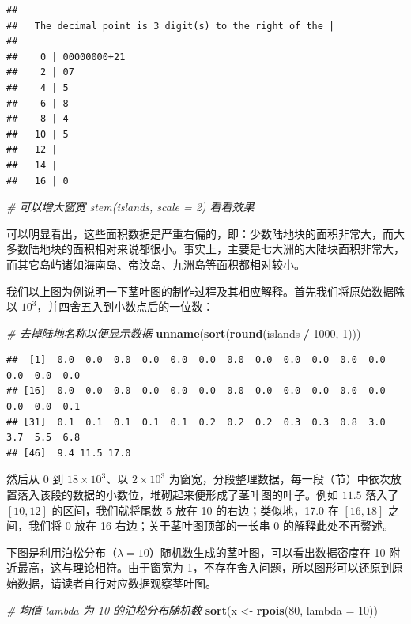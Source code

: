 \documentclass[
  b5paper,
  UTF8,twoside]{book}
\newenvironment{Shaded}{\begin{snugshade}}{\end{snugshade}}
\newcommand{\AttributeTok}[1]{\textcolor[rgb]{0.13,0.29,0.53}{#1}}
\newcommand{\CommentTok}[1]{\textcolor[rgb]{0.56,0.35,0.01}{\textit{#1}}}
\newcommand{\DecValTok}[1]{\textcolor[rgb]{0.00,0.00,0.81}{#1}}
\newcommand{\FunctionTok}[1]{\textcolor[rgb]{0.13,0.29,0.53}{\textbf{#1}}}
\newcommand{\NormalTok}[1]{#1}
\newcommand{\OtherTok}[1]{\textcolor[rgb]{0.56,0.35,0.01}{#1}}
\newcommand{\SpecialCharTok}[1]{\textcolor[rgb]{0.81,0.36,0.00}{\textbf{#1}}}
\begin{document}
\begin{verbatim}
## 
##   The decimal point is 3 digit(s) to the right of the |
## 
##    0 | 00000000+21
##    2 | 07
##    4 | 5
##    6 | 8
##    8 | 4
##   10 | 5
##   12 | 
##   14 | 
##   16 | 0
\end{verbatim}

\begin{Shaded}
\begin{Highlighting}[]
\CommentTok{\# 可以增大窗宽 stem(islands, scale = 2) 看看效果}
\end{Highlighting}
\end{Shaded}

可以明显看出，这些面积数据是严重右偏的，即：少数陆地块的面积非常大，而大多数陆地块的面积相对来说都很小。事实上，主要是七大洲的大陆块面积非常大，而其它岛屿诸如海南岛、帝汶岛、九洲岛等面积都相对较小。

我们以上图为例说明一下茎叶图的制作过程及其相应解释。首先我们将原始数据除以 \(10^{3}\)，并四舍五入到小数点后的一位数：

\begin{Shaded}
\begin{Highlighting}[]
\CommentTok{\# 去掉陆地名称以便显示数据}
\FunctionTok{unname}\NormalTok{(}\FunctionTok{sort}\NormalTok{(}\FunctionTok{round}\NormalTok{(islands }\SpecialCharTok{/} \DecValTok{1000}\NormalTok{, }\DecValTok{1}\NormalTok{)))}
\end{Highlighting}
\end{Shaded}

\begin{verbatim}
##  [1]  0.0  0.0  0.0  0.0  0.0  0.0  0.0  0.0  0.0  0.0  0.0  0.0  0.0  0.0  0.0
## [16]  0.0  0.0  0.0  0.0  0.0  0.0  0.0  0.0  0.0  0.0  0.0  0.0  0.0  0.0  0.1
## [31]  0.1  0.1  0.1  0.1  0.1  0.2  0.2  0.2  0.3  0.3  0.8  3.0  3.7  5.5  6.8
## [46]  9.4 11.5 17.0
\end{verbatim}

然后从 0 到 \(18\times10^{3}\)、以 \(2\times10^{3}\) 为窗宽，分段整理数据，每一段（节）中依次放置落入该段的数据的小数位，堆砌起来便形成了茎叶图的叶子。例如 \(11.5\) 落入了 \([10,12]\) 的区间，我们就将尾数 5 放在 10 的右边；类似地，17.0 在 \([16,18]\) 之间，我们将 0 放在 16 右边；关于茎叶图顶部的一长串 0 的解释此处不再赘述。

下图是利用泊松分布（\(\lambda=10\)）随机数生成的茎叶图，可以看出数据密度在 10 附近最高，这与理论相符。由于窗宽为 1，不存在舍入问题，所以图形可以还原到原始数据，请读者自行对应数据观察茎叶图。

\begin{Shaded}
\begin{Highlighting}[]
\CommentTok{\# 均值 lambda 为 10 的泊松分布随机数}
\FunctionTok{sort}\NormalTok{(x }\OtherTok{\textless{}{-}} \FunctionTok{rpois}\NormalTok{(}\DecValTok{80}\NormalTok{, }\AttributeTok{lambda =} \DecValTok{10}\NormalTok{))}
\end{Highlighting}
\end{Shaded}
\end{document}
